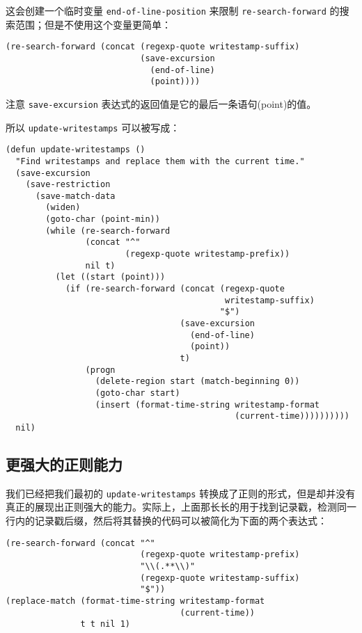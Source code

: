 这会创建一个临时变量 \texttt{end-of-line-position} 来限制 \texttt{re-search-forward} 的搜索范围；但是不使用这个变量更简单：

\begin{verbatim}
(re-search-forward (concat (regexp-quote writestamp-suffix)
                           (save-excursion
                             (end-of-line)
                             (point))))
\end{verbatim}

注意 \texttt{save-excursion} 表达式的返回值是它的最后一条语句(point)的值。

所以 \texttt{update-writestamps} 可以被写成：

\begin{verbatim}
(defun update-writestamps ()
  "Find writestamps and replace them with the current time."
  (save-excursion
    (save-restriction
      (save-match-data
        (widen)
        (goto-char (point-min))
        (while (re-search-forward
                (concat "^"
                        (regexp-quote writestamp-prefix))
                nil t)
          (let ((start (point)))
            (if (re-search-forward (concat (regexp-quote
                                            writestamp-suffix)
                                           "$")
                                   (save-excursion
                                     (end-of-line)
                                     (point))
                                   t)
                (progn
                  (delete-region start (match-beginning 0))
                  (goto-char start)
                  (insert (format-time-string writestamp-format
                                              (current-time))))))))))
  nil)
\end{verbatim}

\subsection{更强大的正则能力}
\label{section:04-More-Regexp-Power}

我们已经把我们最初的 \texttt{update-writestamps} 转换成了正则的形式，但是却并没有真正的展现出正则强大的能力。实际上，上面那长长的用于找到记录戳，检测同一行内的记录戳后缀，然后将其替换的代码可以被简化为下面的两个表达式：

\begin{verbatim}
(re-search-forward (concat "^"
                           (regexp-quote writestamp-prefix)
                           "\\(.**\\)"
                           (regexp-quote writestamp-suffix)
                           "$"))
(replace-match (format-time-string writestamp-format
                                   (current-time))
               t t nil 1)
\end{verbatim}

